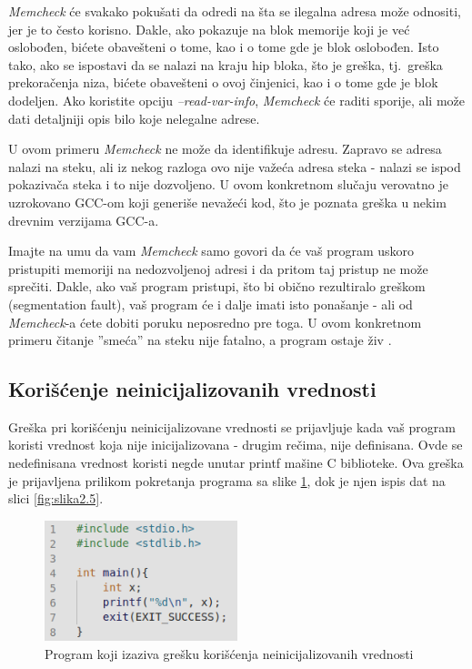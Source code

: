 \documentclass[12pt,oneside]{memoir}
\theoremstyle{plain}
\theoremstyle{definition}
\begin{document}
\textit{Memcheck} će svakako pokušati da odredi na šta se ilegalna adresa može odnositi, jer je to često korisno. Dakle, ako pokazuje na blok memorije koji je već oslobođen, bićete obavešteni o tome, kao i o tome gde je blok oslobođen. Isto tako, ako se ispostavi da se nalazi na kraju hip bloka, što je greška, tj.~greška prekoračenja niza, bićete obavešteni o ovoj činjenici, kao i o tome gde je blok dodeljen. Ako koristite opciju \textit{--read-var-info}, \textit{Memcheck} će raditi sporije, ali može dati detaljniji opis bilo koje nelegalne adrese.

U ovom primeru \textit{Memcheck} ne može da identifikuje adresu. Zapravo se adresa nalazi na steku, ali iz nekog razloga ovo nije važeća adresa steka - nalazi se ispod pokazivača steka i to nije dozvoljeno. U ovom konkretnom slučaju verovatno je uzrokovano GCC-om koji generiše nevažeći kod, što je poznata greška u nekim drevnim verzijama GCC-a.

Imajte na umu da vam \textit{Memcheck} samo govori da će vaš program uskoro pristupiti memoriji na nedozvoljenoj adresi i da pritom taj pristup ne može sprečiti. Dakle, ako vaš program pristupi, što bi obično rezultiralo greškom (segmentation fault), vaš program će i dalje imati isto ponašanje - ali od \textit{Memcheck}-a ćete dobiti poruku neposredno pre toga. U ovom konkretnom primeru čitanje ''smeća'' na steku nije fatalno, a program ostaje živ \cite{Memcheck}. 

\subsection{Korišćenje neinicijalizovanih vrednosti}
Greška pri korišćenju neinicijalizovane vrednosti se prijavljuje kada vaš program koristi vrednost koja nije inicijalizovana - drugim rečima, nije definisana. Ovde se nedefinisana vrednost koristi negde unutar printf mašine C biblioteke. Ova greška je prijavljena prilikom pokretanja programa sa slike \ref{fig:slika2.4}, dok je njen ispis dat na slici \ref{fig:slika2.5}.

\begin{figure}[!ht]
  \centering
  \includegraphics[width=0.5\textwidth]{uninitialisedErrorProgram.png}
  \caption{Program koji izaziva grešku korišćenja neinicijalizovanih vrednosti}
  \label{fig:slika2.4}
\end{figure}
\end{document}
